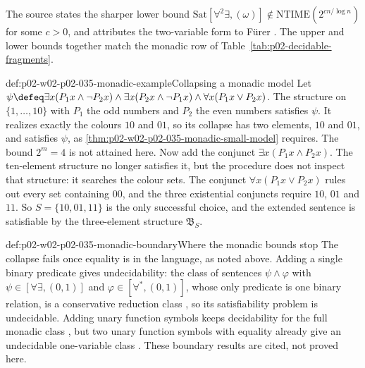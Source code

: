The source states the sharper lower bound
\(\mathrm{Sat}[\forall^2\exists,(\omega)]\notin\mathrm{NTIME}(2^{cn/\log n})\)
for some \(c>0\), and attributes the two-variable form to F\"urer
\cite[thm.~6.2.13 and cor.~6.2.14]{BorgerGradelGurevich1997}.  The upper and
lower bounds together match the monadic row of
Table~\ref{tab:p02-decidable-fragments}.

\begin{hbexample}{def:p02-w02-p02-035-monadic-example}{Collapsing a monadic model}
Let \(\psi\defeq\exists x(P_1x\land\neg P_2x)\land\exists x(P_2x\land\neg P_1x)
\land\forall x(P_1x\lor P_2x)\).  The structure on \(\{1,\ldots,10\}\) with
\(P_1\) the odd numbers and \(P_2\) the even numbers satisfies \(\psi\).  It
realizes exactly the colours \(10\) and \(01\), so its collapse has two
elements, \(10\) and \(01\), and satisfies \(\psi\), as
\cref{thm:p02-w02-p02-035-monadic-small-model} requires.  The bound \(2^m=4\)
is not attained here.  Now add the conjunct \(\exists x(P_1x\land P_2x)\).
The ten-element structure no longer satisfies it, but the procedure does not
inspect that structure: it searches the colour sets.  The conjunct
\(\forall x(P_1x\lor P_2x)\) rules out every set containing \(00\), and the
three existential conjuncts require \(10\), \(01\) and \(11\).  So
\(S=\{10,01,11\}\) is the only successful choice, and the extended sentence is
satisfiable by the three-element structure \(\mathfrak B_S\).
\end{hbexample}

\begin{hbwarning}{def:p02-w02-p02-035-monadic-boundary}{Where the monadic bounds stop}
The collapse fails once equality is in the language, as noted above.  Adding a
single binary predicate gives undecidability: the class of sentences
\(\psi\land\varphi\) with \(\psi\in[\forall\exists,(0,1)]\) and
\(\varphi\in[\forall^{*},(0,1)]\), whose only predicate is one binary
relation, is a conservative reduction class
\cite[thm.~3.1.23]{BorgerGradelGurevich1997}, so its satisfiability problem
is undecidable.  Adding unary function symbols keeps decidability for the
full monadic class \cite[cor.~6.2.8]{BorgerGradelGurevich1997}, but two unary
function symbols with equality already give an undecidable one-variable
class \cite[p.~11]{GradelKolaitisVardi1997}.  These boundary results are
cited, not proved here.
\end{hbwarning}

